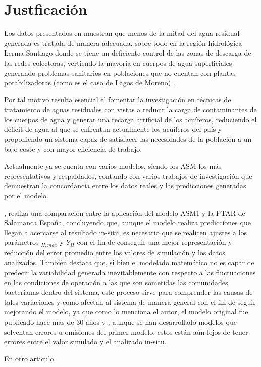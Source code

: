 \section{Justficación}
Los datos presentados en \cite{ODS23} muestran que menos de la mitad del agua residual generada es tratada de manera adecuada, sobre todo en la región hidrológica Lerma-Santiago donde se tiene un deficiente control de las zonas de descarga de las redes colectoras, vertiendo la mayoría en cuerpos de agua superficiales generando problemas sanitarios en poblaciones que no cuentan con plantas potabilizadoras (como es el caso de Lagos de Moreno) \citep{CEAJ2015}.\par
Por tal motivo resulta esencial el fomentar la investigación en técnicas de tratamiento de aguas residuales con vistas a reducir la carga de contaminantes de los cuerpos de agua y generar una recarga artificial de los acuíferos, reduciendo el déficit de agua al que se enfrentan actualmente los acuíferos del país y proponiendo un sistema capaz de satisfacer las necesidades de la población a un bajo coste y con mayor eficiencia de trabajo.\par
Actualmente ya se cuenta con varios modelos, siendo los \gls{ASM} los más representativos y respaldados, contando con varios trabajos de investigación que demuestran la concordancia entre los datos reales y las predicciones generadas por el modelo.\par
\cite{Costa2022}, realiza una comparación entre la aplicación del modelo \acrshort{ASM}1 y la \acrshort{PTAR} de Salamanca España, concluyendo que, aunque el modelo realiza predicciones que llegan a acercarse al resultado in-situ, es necesario que se realicen ajustes a los parámetros \textit{}$_{H,max}$ y $Y_{H}$ con el fin de conseguir una mejor representación y reducción del error promedio entre los valores de simulación y los datos analizados. También destaca que, si bien el modelado matemático no es capar de predecir la variabilidad generada inevitablemente con respecto a las fluctuaciones en las condiciones de operación a las que son sometidas las comunidades bacterianas dentro del sistema, este proceso sirve para comprender las causas de tales variaciones y como afectan al sistema de manera general con el fin de seguir mejorando el modelo, ya que como lo menciona el autor, el modelo original fue publicado hace mas de 30 años y , aunque se han desarrollado modelos que solventan errores u omisiones del primer modelo, estos están aún lejos de tener errores entre el valor simulado y el analizado in-situ.\par
En otro articulo, \cite{Petersen2002}